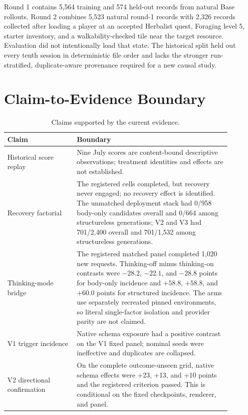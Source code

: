 \documentclass[10pt]{article}
\begin{document}
Round 1 contains 5,564 training and 574 held-out records from natural Base
rollouts. Round 2 combines 5,523 natural round-1 records with 2,326 records
collected after loading a player at an accepted Herbalist quest, Foraging level
5, starter inventory, and a walkability-checked tile near the target resource.
Evaluation did not intentionally load that state. The historical split held out
every tenth session in deterministic file order and lacks the stronger
run-stratified, duplicate-aware provenance required for a new causal study.

\Needspace{0.52\textheight}
\section{Claim-to-Evidence Boundary}

\begin{table}[H]
\caption{Claims supported by the current evidence.}
\centering
\small
\begin{tabular}{>{\raggedright\arraybackslash}p{0.28\linewidth}
                >{\raggedright\arraybackslash}p{0.62\linewidth}}
\toprule
Claim & Boundary \\
\midrule
Historical score replay & Nine July scores are content-bound descriptive
observations; treatment identities and effects are not established. \\
Recovery factorial & The registered cells completed, but recovery never
engaged; no recovery effect is identified. The unmatched deployment stack had
0/958 body-only candidates overall and 0/664 among structureless generations;
V2 and V3 had 701/2,400 overall and 701/1,532 among structureless generations. \\
Thinking-mode bridge & The registered matched panel completed 1,020 new
requests. Thinking-off minus thinking-on contrasts were $-28.2$, $-22.1$, and
$-28.8$ points for body-only incidence and $+58.8$, $+58.8$, and $+60.0$ points
for structured incidence. The
arms use separately recreated pinned environments, so literal single-factor
isolation and provider parity are not claimed. \\
V1 trigger incidence & Native schema exposure had a positive contrast on the
V1 fixed panel; nominal seeds were ineffective and duplicates are collapsed. \\
V2 directional confirmation & On the complete outcome-unseen grid, native
schema effects were +23, +13, and +10 points and the registered criterion
passed. This is conditional on the fixed checkpoints, renderer, and panel. \\

\end{tabular}
\end{table}
\end{document}
